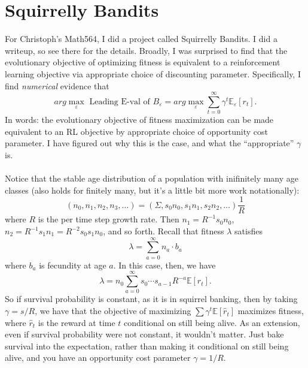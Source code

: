 \section{Squirrelly Bandits}
For Christoph's Math564, I did a project called Squirrelly Bandits. I did a writeup, so see there for the details. Broadly,
I was surprised to find that the evolutionary objective of optimizing fitness is equivalent to a reinforcement learning
objective via appropriate choice of discounting parameter. Specifically, I find \textit{numerical} evidence that
$$ arg\max_{\varepsilon} \text{ Leading E-val of }B_{\varepsilon} = 
arg\max_{\varepsilon} \sum\limits_{t = 0}^\infty \gamma^t \mathbb{E}_{\varepsilon}\left[ r_t \right].$$
In words: the evolutionary objective of fitness maximization can be made equivalent to an RL objective by appropriate choice of 
opportunity cost parameter. I have figured out why this is the case, and what the ``appropriate'' $\gamma$ is. \\ \\

Notice that the stable age distribution of a population with inifinitely many age classes (also holds for finitely many, but
it's a little bit more work notationally):
$$ (n_0, n_1, n_2, n_3, \ldots) = (\Sigma, s_0 n_0, s_1 n_1, s_2 n_2, \ldots)\frac{1}{R} $$
where $R$ is the per time step growth rate. Then $n_1 = R^{-1} s_0 n_0$, $n_2 = R^{-1} s_1n_1 = R^{-2} s_0s_1 n_0 $, and so forth. 
Recall that fitness $\lambda$ satisfies
$$ \lambda = \sum\limits_{a = 0}^\infty n_a \cdot b_a $$
where $b_a$ is fecundity at age $a$. In this case, then, we have
$$ \lambda = n_0\sum\limits_{a = 0}^\infty s_0 \cdots s_{a-1} R^{-a} \mathbb{E}\left[ r_t \right].$$
So if survival probability is constant, as it is in squirrel banking, then by taking $\gamma = s/R$, we have that the objective of
maximizing $\sum \gamma^t \mathbb{E}\left[ \hat r_t \right]$ maximizes fitness, where $\hat r_t$ is the reward at time $t$ conditional
on still being alive. As an extension, even if survival probability were not constant,
it wouldn't matter. Just bake survival into the expectation, rather than making it conditional on still being alive, and you have an opportunity
cost parameter $\gamma = 1/R$. 
